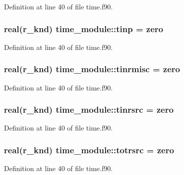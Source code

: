 Definition at line 40 of file time.\-f90.

\hypertarget{classtime__module_a4d112ccfe86d8ab7b0a2c04b98078db3}{
\subsubsection[{tinp}]{\setlength{\rightskip}{0pt plus 5cm}real(r\-\_\-knd) time\-\_\-module\-::tinp = zero}}\label{classtime__module_a4d112ccfe86d8ab7b0a2c04b98078db3}


Definition at line 40 of file time.\-f90.

\hypertarget{classtime__module_a548875e460521a98bdde436c107d5da0}{
\subsubsection[{tinrmisc}]{\setlength{\rightskip}{0pt plus 5cm}real(r\-\_\-knd) time\-\_\-module\-::tinrmisc = zero}}\label{classtime__module_a548875e460521a98bdde436c107d5da0}


Definition at line 40 of file time.\-f90.

\hypertarget{classtime__module_a384b45af0c322ff75699b051ec3a96ec}{
\subsubsection[{tinrsrc}]{\setlength{\rightskip}{0pt plus 5cm}real(r\-\_\-knd) time\-\_\-module\-::tinrsrc = zero}}\label{classtime__module_a384b45af0c322ff75699b051ec3a96ec}


Definition at line 40 of file time.\-f90.

\hypertarget{classtime__module_a309311ea73088ac5662d6acaf1aca614}{
\subsubsection[{totrsrc}]{\setlength{\rightskip}{0pt plus 5cm}real(r\-\_\-knd) time\-\_\-module\-::totrsrc = zero}}\label{classtime__module_a309311ea73088ac5662d6acaf1aca614}


Definition at line 40 of file time.\-f90.

